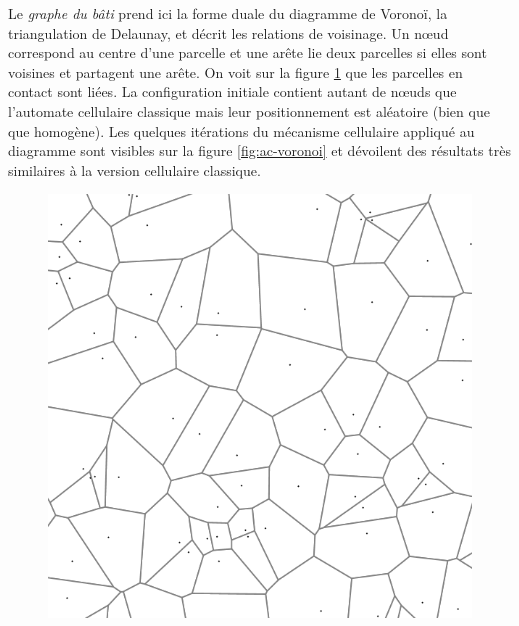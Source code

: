 \documentclass[12pt]{article}
\begin{document}
Le \textit{graphe du bâti} prend ici la forme duale du diagramme de
Voronoï, la triangulation de Delaunay, et décrit les relations de
voisinage. Un n\oe ud correspond au centre d'une parcelle et une arête
lie deux parcelles si elles sont voisines et partagent une arête. On
voit sur la figure \ref{fig:lots-graph} que les parcelles en contact
sont liées. La configuration initiale contient autant de n\oe uds que
l'automate cellulaire classique mais leur positionnement est aléatoire
(bien que que homogène). Les quelques itérations du mécanisme
cellulaire appliqué au diagramme sont visibles sur la figure
\ref{fig:ac-voronoi} et dévoilent des résultats très similaires à la
version cellulaire classique.

\begin{figure}[H]
  \centering
  \includegraphics[width=.8\linewidth]{images/lots-graph.png}
  \caption{}
  \label{fig:lots-graph}
\end{figure}
\end{document}

